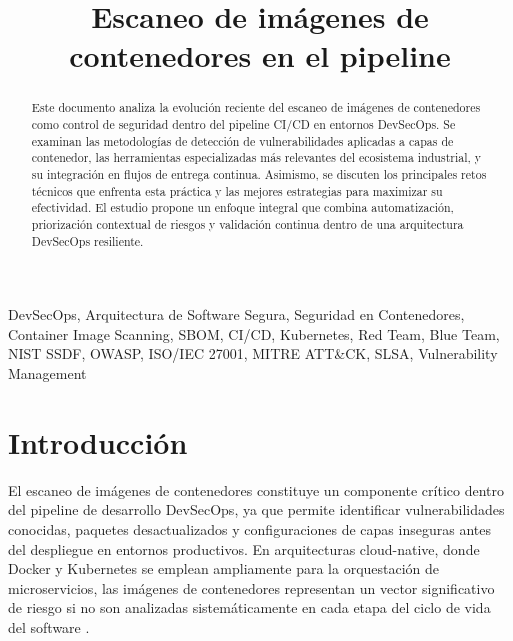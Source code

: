 \documentclass[journal]{IEEEtran}
\begin{document}
\title{Escaneo de imágenes de contenedores en el pipeline}

\author{

}

\maketitle

\begin{abstract}
Este documento analiza la evolución reciente del escaneo de imágenes de contenedores como control de seguridad dentro del pipeline CI/CD en entornos DevSecOps. Se examinan las metodologías de detección de vulnerabilidades aplicadas a capas de contenedor, las herramientas especializadas más relevantes del ecosistema industrial, y su integración en flujos de entrega continua. Asimismo, se discuten los principales retos técnicos que enfrenta esta práctica y las mejores estrategias para maximizar su efectividad. El estudio propone un enfoque integral que combina automatización, priorización contextual de riesgos y validación continua dentro de una arquitectura DevSecOps resiliente.
\end{abstract}

\begin{IEEEkeywords}
DevSecOps, Arquitectura de Software Segura, Seguridad en Contenedores, Container Image Scanning, SBOM, CI/CD, Kubernetes, Red Team, Blue Team, NIST SSDF, OWASP, ISO/IEC 27001, MITRE ATT\&CK, SLSA, Vulnerability Management
\end{IEEEkeywords}

\section{Introducción}

El escaneo de imágenes de contenedores constituye un componente crítico dentro del pipeline de desarrollo DevSecOps, ya que permite identificar vulnerabilidades conocidas, paquetes desactualizados y configuraciones de capas inseguras antes del despliegue en entornos productivos. En arquitecturas cloud-native, donde Docker y Kubernetes se emplean ampliamente para la orquestación de microservicios, las imágenes de contenedores representan un vector significativo de riesgo si no son analizadas sistemáticamente en cada etapa del ciclo de vida del software \cite{ref4}.
\end{document}
